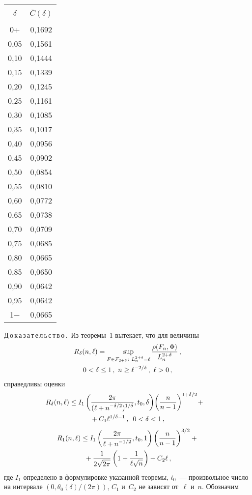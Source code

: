 \begin{multicols}{2}
{\small
\begin{center}
\tabcolsep=16pt
\begin{tabular}{|c|c|}
\hline &\\[-9pt]
 $\delta$ & $\overline{C}(\delta)$ \\[2pt]
\hline
&\\[-8pt]
 0+    &  0,1692  \\
 0,05  &  0,1561  \\
 0,10  &  0,1444  \\
 0,15  &  0,1339  \\
 0,20  &  0,1245  \\
 0,25  &  0,1161  \\
 0,30  &  0,1085  \\
 0,35  &  0,1017  \\
 0,40  &  0,0956  \\
 0,45  &  0,0902  \\
 0,50  &  0,0854  \\
 0,55  &  0,0810  \\
 0,60  &  0,0772  \\
 0,65  &  0,0738  \\
 0,70  &  0,0709  \\
 0,75  &  0,0685  \\
 0,80  &  0,0665  \\
 0,85  &  0,0650  \\
 0,90  &  0,0642  \\
 0,95  &  0,0642  \\
 1$-$  &  0,0665  \\
\hline
\end{tabular}
\end{center}
}
\vspace*{6pt}


\bigskip
\addtocounter{table}{1}

\noindent
Д\,о\,к\,а\,з\,а\,т\,е\,л\,ь\,с\,т\,в\,о\,.\
Из теоремы~1 вытекает, что для величины
\begin{multline*}
R_\delta(n,\ell)=\sup_{F\in{\mathcal F}_{2+\delta}\colon L_n^{2+\delta}=\ell}
\displaystyle\frac{\displaystyle \rho(F_n,\Phi)\mathstrut}{\displaystyle L_n^{2+\delta}\mathstrut}\,,\\
 0<\delta\le1\,,\ n\ge\ell^{-2/\delta}\,,\
\ell >0\,,
\end{multline*}
справедливы оценки
\begin{multline*}
\!\!\!\!R_\delta(n,\ell)\le
I_1\left(\displaystyle\frac{\displaystyle 2\pi\mathstrut}{\displaystyle (\ell+n^{-\delta/2})^{1/\delta}\mathstrut},t_0,\delta\right)\!
\left(\displaystyle\frac{\displaystyle n\mathstrut}{\displaystyle n-1\mathstrut}\right)^{1+\delta/2}\! +{}\\
{}+C_1\ell^{1/\delta-1}\,,\enskip 0<\delta<1\,,
\end{multline*}
\begin{multline*}
R_1(n,\ell)\le I_1\left(\displaystyle\frac{\displaystyle 2\pi\mathstrut}{\displaystyle \ell+n^{-1/2}\mathstrut},t_0,1\right)
\left(\displaystyle\frac{\displaystyle n\mathstrut}{\displaystyle n-1\mathstrut}\right)^{3/2} +{}\\
{}+
\displaystyle\frac{\displaystyle 1\mathstrut}{\displaystyle 2\sqrt{2\pi}\mathstrut}\left(1+\displaystyle\frac{\displaystyle 1\mathstrut}{\displaystyle \ell\sqrt{n}\mathstrut}\right)+ C_2\ell\,,
\end{multline*}
где $I_1$ определено в формулировке указанной тео\-ре\-мы, $t_0$~---
произвольное число на интервале $(0,\theta_0(\delta)/(2\pi))$, $C_1$
и~$C_2$ не зависят от~$\ell$ и~$n$. Обозначим


\end{multicols}

